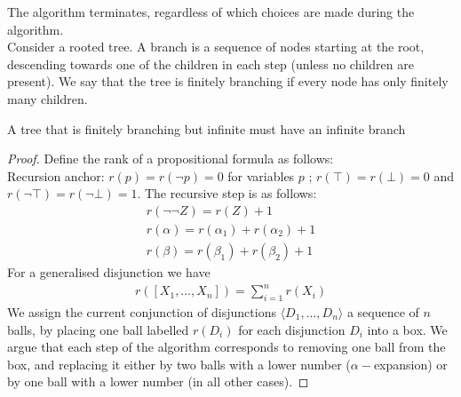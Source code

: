 \documentclass[a4paper]{article}
\theoremstyle{plain}
\newtheorem{thm}{Theorem}[section]
\newtheorem{lem}[thm]{Lemma}
\theoremstyle{definition}
\theoremstyle{remark}
\begin{document}
\begin{tcolorbox}[colback=black!3!white,colframe=black!60!white,title=\begin{thm}Terminal of Alorithm \label{Terminal of Alorithm}\end{thm}]
	The algorithm terminates, regardless of which choices are made during the algorithm. \\
	Consider a rooted tree. A branch is a sequence of nodes starting at the root, descending towards one of the children in each step (unless no children are present). We say that the tree is finitely branching if every node has only finitely many children. 
	\begin{tcolorbox}[colback=black!3!white,colframe=black!60!white,title=\begin{lem}Konig's Lemma \label{Konig's Lemma}\end{lem}]
	        A tree that is finitely branching but infinite must have an infinite branch
	\end{tcolorbox}
	\begin{proof}
		Define the rank of a propositional formula as follows: \\
		Recursion anchor: $r(p) = r(\neg p) = 0$ for variables $p$ ; $r( \top) = r(\bot)=0$ and $r(\neg \top) = r\left( \neg \bot \right) = 1$. The recursive step is as follows:
		\begin{align}
			r(\neg \neg Z) = r(Z) + 1 \\
			r(\alpha) = r(\alpha_1)+r(\alpha_2) + 1 \\
			r(\beta) = r(\beta_1) + r(\beta_2) + 1
		\end{align}
		For a generalised disjunction we have
		\begin{align}
			r([X_1,\ldots,X_n]) = \sum_{i=1}^{n} r(X_i)
	\end{align}
	We assign the current conjunction of disjunctions $\langle D_1,\ldots,D_n \rangle$ a sequence of $n$ balls, by placing one ball labelled $r(D_i)$ for each disjunction $D_i$ into a box. We argue that each step of the algorithm corresponds to removing one ball from the box, and replacing it either by two balls with a lower number ($\alpha-$expansion) or by one ball with a lower number (in all other cases).
	\end{proof}
\end{tcolorbox}
\end{document}
